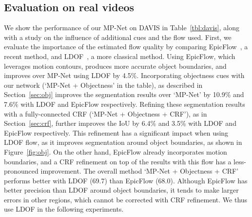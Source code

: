\documentclass[10pt,twocolumn,letterpaper]{article}
\begin{document}
\subsection{Evaluation on real videos}
\label{sec:realvidexp}
\vspace{-0.2cm}
We show the performance of our MP-Net on DAVIS in Table~\ref{tbl:davis}, along
with a study on the influence of additional cues and the flow used. First, we
evaluate the importance of the estimated flow quality by comparing
EpicFlow~\cite{Revaud15}, a recent method, and
LDOF~\cite{Brox11a,sundaram2010dense}, a more classical method. Using EpicFlow,
which leverages motion contours, produces more accurate object boundaries, and
improves over MP-Net using LDOF by 4.5\%. Incorporating objectness cues with
our network (`MP-Net + Objectness' in the table), as described in
Section~\ref{sec:obj} improves the segmentation results over `MP-Net' by 10.9\%
and 7.6\% with LDOF and EpicFlow respectively. Refining these segmentation
results with a fully-connected CRF (`MP-Net + Objectness + CRF'), as in
Section~\ref{sec:crf}, further improves the IoU by 6.4\% and 3.5\% with LDOF
and EpicFlow respectively. This refinement has a significant impact when using
LDOF flow, as it improves segmentation around object boundaries, as shown in
Figure~\ref{fig:obj}. On the other hand, EpicFlow already incorporates motion
boundaries, and a CRF refinement on top of the results with this flow has a
less-pronounced improvement. The overall method `MP-Net + Objectness + CRF'
performs better with LDOF (69.7) than EpicFlow (68.0). Although EpicFlow has
better precision than LDOF around object boundaries, it tends to make larger
errors in other regions, which cannot be corrected with CRF refinement.  We
thus use LDOF in the following experiments.

\vspace{-0.2cm}
\end{document}

